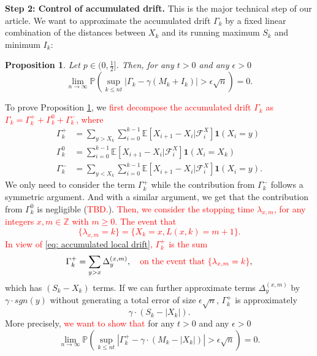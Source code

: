 \documentclass[twoside,12pt,a4paper]{article}
\newtheorem{proposition}{Proposition}[section]
\numberwithin{equation}{section}
\newcommand{\abs}[1]{\left\vert #1 \right\vert}
\newcommand\TBD{\textcolor{red}{TBD.}}
\newcommand{\edt}[1]{\textcolor{red}{#1}} %
\begin{document}
	\textbf{Step 2: Control of accumulated drift.} This is the major technical step of our article. We want to approximate the accumulated drift $\Gamma_k$ by a fixed linear combination of the distances between $X_k$ and its running maximum $S_k$ and minimum $I_k$:
	\begin{proposition}\label{lm: control of acc drift}
		Let $p\in (0,\frac{1}{2}]$. Then, for any $t>0$ and any $\epsilon >0$
		\begin{equation}\label{eq: control of acc drift}
			\lim_{n \to \infty }\mathbb{P}\left(\sup_{k\leq nt} \abs{\Gamma_k - \gamma \left(M_k + I_k \right)   } > \epsilon \sqrt{n}  \right) =0. 
		\end{equation}
	\end{proposition}
	To prove Proposition \ref{lm: control of acc drift}, we \edt{first decompose the accumulated drift $\Gamma_k$ as $\Gamma_k = 	\Gamma_k^+ +	\Gamma_k^0 + \Gamma_k^-$, where} 
	\begin{align*}
		\Gamma_k^+ &= \sum_{y > X_k} \sum_{i = 0}^{k-1} \mathbb{E}\left[ X_{i + 1} - X_i | \mathcal{F}_i^X \right] \mathbf{1}(X_i = y)\\
		\Gamma_k^0 &= \sum_{i = 0}^{k-1} \mathbb{E}\left[ X_{i + 1} - X_i | \mathcal{F}_i^X \right] \mathbf{1}(X_i = X_k) \\
		\Gamma_k^- &= \sum_{y < X_k} \sum_{i = 0}^{k-1} \mathbb{E}\left[ X_{i + 1} - X_i | \mathcal{F}_i^X \right] \mathbf{1}(X_i = y)
		.\end{align*} 
	 We only need to consider the term $\Gamma_k^+$ while the contribution from $\Gamma_k^-$ follows a symmetric argument. And with a similar argument, we get that the contribution from $\Gamma_k^0$ is negligible (\TBD).
	 \edt{
	 Then,  we consider the stopping time $\lambda_{x,m}$, for any integers $x ,m  \in \mathbb{Z}$ with $m \geq 0$. The event that 
	 $$\{ \lambda_{x,m} =k \} = \{ X_k = x, L(x,k) =m +1  \}.  $$ 
	In view of \eqref{eq: accumulated local drift},  $\Gamma_k^+$ is the sum} 
	\begin{equation}
	\Gamma_k^+ = \sum_{y>x} \Delta_y^{(x,m)}, \mbox{\edt{\quad on the event that $\{ \lambda_{x,m}=k  \}$}},
	\end{equation} 
	which has $(S_k - X_k)$ terms. If we can further approximate terms $\Delta_y^{(x,m)}$ by $\gamma\cdot sgn(y)$ without generating a total error of size $\epsilon \sqrt{n}$, $\Gamma_k^+$ is approximately 
	$$   
	\gamma \cdot (S_k - \abs{X_k}).
	$$
	More precisely, \edt{we want to show that} for any $t>0$ and any $\epsilon >0$
	\begin{equation}\label{eq: control of acc drift + }
		\lim_{n \to \infty }\mathbb{P}\left(\sup_{k\leq nt} \abs{\Gamma^+_k - \gamma \cdot \left(M_k - \abs{X_k} \right)   } > \epsilon \sqrt{n}  \right) =0. 
	\end{equation}
\end{document}
